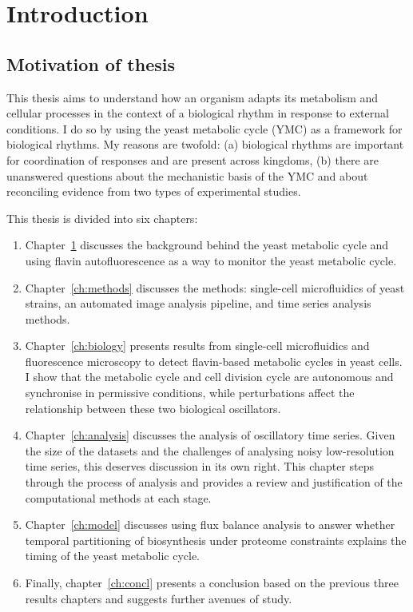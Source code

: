 \chapter{Introduction}
\label{ch:intro}

\section{Motivation of thesis}

This thesis aims to understand how an organism adapts its metabolism and cellular processes in the context of a biological rhythm in response to external conditions.
I do so by using the yeast metabolic cycle (YMC) as a framework for biological rhythms.
My reasons are twofold: (a) biological rhythms are important for coordination of responses and are present across kingdoms, (b) there are unanswered questions about the mechanistic basis of the YMC and about reconciling evidence from two types of experimental studies.

This thesis is divided into six chapters:
\begin{enumerate}
  \item Chapter~\ref{ch:intro} discusses the background behind the yeast metabolic cycle and using flavin autofluorescence as a way to monitor the yeast metabolic cycle.
  \item Chapter~\ref{ch:methods} discusses the methods: single-cell microfluidics of yeast strains, an automated image analysis pipeline, and time series analysis methods.
  \item Chapter~\ref{ch:biology} presents results from single-cell microfluidics and fluorescence microscopy to detect flavin-based metabolic cycles in yeast cells.
        I show that the metabolic cycle and cell division cycle are autonomous and synchronise in permissive conditions, while perturbations affect the relationship between these two biological oscillators.
  \item Chapter~\ref{ch:analysis} discusses the analysis of oscillatory time series.
        Given the size of the datasets and the challenges of analysing noisy low-resolution time series, this deserves discussion in its own right.
        This chapter steps through the process of analysis and provides a review and justification of the computational methods at each stage.
  \item Chapter~\ref{ch:model} discusses using flux balance analysis to answer whether temporal partitioning of biosynthesis under proteome constraints explains the timing of the yeast metabolic cycle.
  \item Finally, chapter~\ref{ch:concl} presents a conclusion based on the previous three results chapters and suggests further avenues of study.
\end{enumerate}


